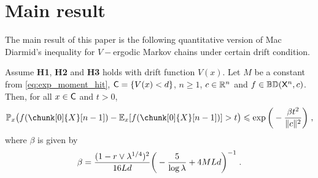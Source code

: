 \documentclass[leqno,11pt,a4paper]{article}
\begin{document}
\section{Main result}\label{sec:Main}
The main result of this paper  is the following quantitative version of Mac Diarmid's inequality for $V-$ergodic Markov chains under certain drift condition.
\begin{theorem}\label{thm:ConcMarkVErgodic}
 Assume {\bf H1}, {\bf H2} and {\bf H3} holds with drift function $V(x)$. Let $M$ be a constant from \ref{eq:exp_moment_hit}, $\mathsf{C} = \{V(x) < d\}$, $n\geqslant 1$, $c\in \mathbb{R}^n$ and  $f\in \mathbb{BD}(\mathsf{X}^n,c)$. Then, for all $x\in \mathsf{C}$ and $t > 0$,
 \[
\Pbb_x\big(f( \chunk[0]{X}[n-1])-\Ebb_x[f(\chunk[0]{X}[n-1])]>t\big)\leqslant \exp\bigg(-\frac{\beta t^2}{\|c\|^2}\bigg)\eqsp,
 \]
where $\beta$ is given by
 \[
 \beta=\frac{(1-r\vee \lambda^{1/4})^2}{16Ld}\bigg(-\frac5{\log \lambda}+4MLd\bigg)^{-1}\;.
 \]
\end{theorem}
\end{document}
